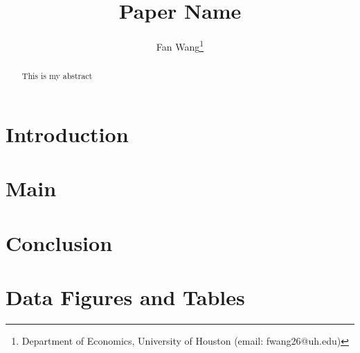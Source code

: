 



\title{Paper Name}

\author{Fan Wang\thanks{Department of Economics, University of Houston (email: fwang26@uh.edu)}}

\maketitle
\begin{abstract}
\singlespacing This is my abstract \end{abstract}
\vfill
\pagebreak{}

\section{Introduction}

\section{Main}

\section{Conclusion}

\pagebreak

\pagebreak

\appendix
\section{Data Figures and Tables}



